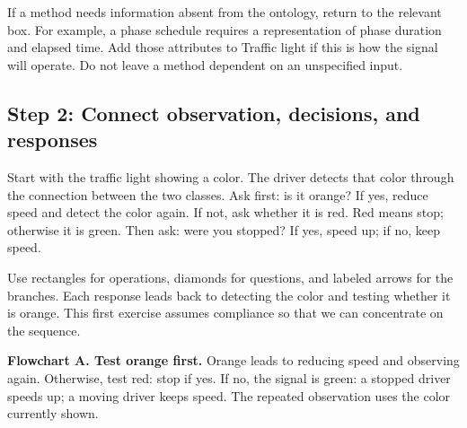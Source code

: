 \documentclass[11pt,a4paper]{article}
\begin{document}
If a method needs information absent from the ontology, return to the relevant box. For example, a phase schedule requires a representation of phase duration and elapsed time. Add those attributes to Traffic light if this is how the signal will operate. Do not leave a method dependent on an unspecified input.

\subsection{Step 2: Connect observation, decisions, and responses}

Start with the traffic light showing a color. The driver detects that color through the connection between the two classes. Ask first: is it orange? If yes, reduce speed and detect the color again. If not, ask whether it is red. Red means stop; otherwise it is green. Then ask: were you stopped? If yes, speed up; if no, keep speed.

Use rectangles for operations, diamonds for questions, and labeled arrows for the branches. Each response leads back to detecting the color and testing whether it is orange. This first exercise assumes compliance so that we can concentrate on the sequence.

\begin{center}
\end{center}
{\small\textbf{Flowchart A. Test orange first.} Orange leads to reducing speed and observing again. Otherwise, test red: stop if yes. If no, the signal is green: a stopped driver speeds up; a moving driver keeps speed. The repeated observation uses the color currently shown.}
\end{document}
